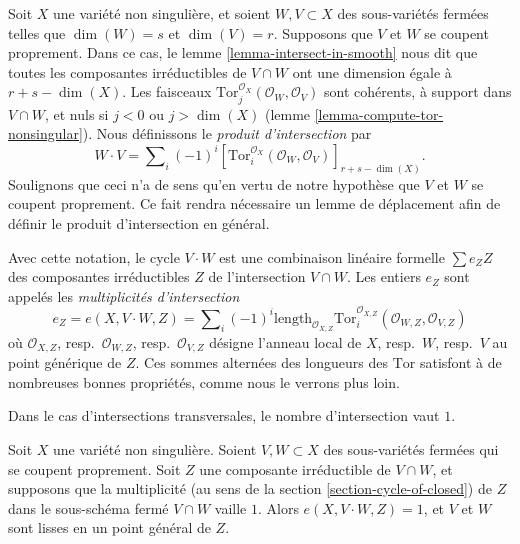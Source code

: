 \noindent
Soit $X$ une variété non singulière, et soient $W, V \subset X$
des sous-variétés fermées telles que $\dim(W) = s$ et $\dim(V) = r$.
Supposons que $V$ et $W$ se coupent proprement.
Dans ce cas, le lemme \ref{lemma-intersect-in-smooth} nous dit que toutes les composantes
irréductibles de $V \cap W$ ont une dimension égale à $r + s - \dim(X)$.
Les faisceaux $\text{Tor}_j^{\mathcal{O}_X}(\mathcal{O}_W, \mathcal{O}_V)$ sont
cohérents, à support dans $V \cap W$, et nuls si $j < 0$ ou $j > \dim(X)$
(lemme \ref{lemma-compute-tor-nonsingular}).
Nous définissons le {\it produit d'intersection} par
$$
W \cdot V = \sum\nolimits_i (-1)^i
[\text{Tor}_i^{\mathcal{O}_X}(\mathcal{O}_W, \mathcal{O}_V)]_{r + s - \dim(X)}.
$$
Soulignons que ceci n'a de sens qu'en vertu de notre hypothèse que
$V$ et $W$ se coupent proprement. Ce fait rendra nécessaire un lemme de
déplacement afin de définir le produit d'intersection en général.

\medskip\noindent
Avec cette notation, le cycle $V \cdot W$ est une combinaison linéaire
formelle $\sum e_Z Z$ des composantes irréductibles $Z$
de l'intersection $V \cap W$. Les entiers $e_Z$ sont appelés
les {\it multiplicités d'intersection}
$$
e_Z = e(X, V \cdot W, Z) =
\sum\nolimits_i
(-1)^i
\text{length}_{\mathcal{O}_{X, Z}}
\text{Tor}_i^{\mathcal{O}_{X, Z}}(\mathcal{O}_{W, Z}, \mathcal{O}_{V, Z})
$$
où $\mathcal{O}_{X, Z}$, resp.\ $\mathcal{O}_{W, Z}$,
resp.\ $\mathcal{O}_{V, Z}$ désigne l'anneau local de $X$, resp.\ $W$,
resp.\ $V$ au point générique de $Z$.
Ces sommes alternées des longueurs des $\text{Tor}$ satisfont à de nombreuses bonnes
propriétés, comme nous le verrons plus loin.

\medskip\noindent
Dans le cas d'intersections transversales, le nombre d'intersection vaut $1$.

\begin{lemma}
\label{lemma-transversal}
Soit $X$ une variété non singulière. Soient $V, W \subset X$ des
sous-variétés fermées qui se coupent proprement. Soit $Z$ une composante irréductible
de $V \cap W$, et supposons que la multiplicité
(au sens de la section \ref{section-cycle-of-closed}) de $Z$
dans le sous-schéma fermé $V \cap W$ vaille $1$.
Alors $e(X, V \cdot W, Z) = 1$, et $V$ et $W$ sont lisses
en un point général de $Z$.
\end{lemma}

